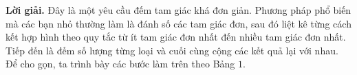 	\begin{figure}[H]
		\centering
		\vspace*{-5pt}
		\captionsetup{labelformat= empty, justification=centering}
		\captionsetup[subfigure]{labelformat=empty}
		\hfill{}
		\hfill
		\hfill
		\hfill
		\vspace*{-10pt}
	\end{figure}
	\textbf{\color{toancuabi}Lời giải.} Đây là một yêu cầu đếm tam giác khá đơn giản. Phương pháp phổ biến mà các bạn nhỏ thường làm là đánh số các tam giác đơn, sau đó liệt kê từng cách kết hợp hình theo quy tắc từ ít tam giác đơn nhất đến nhiều tam giác đơn nhất. Tiếp đến là đếm số lượng từng loại và cuối cùng cộng các kết quả lại với nhau. Để cho gọn, ta trình bày các bước làm trên theo Bảng $1$.
	\begin{figure}[H]
		\centering
		\vspace*{-5pt}
		\captionsetup{labelformat= empty, justification=centering}
		\captionsetup[subfigure]{labelformat=empty}
		\hfill{}
		\hfill
		\hfill
		\hfill
		\vspace*{-10pt}
	\end{figure}   
